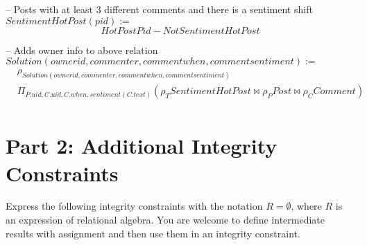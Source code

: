 \documentclass{article}
\newcommand{\var}[1]{\mathit{#1}}
\begin{document}
\begin{enumerate}
{-- Posts with at least 3 different comments and there is a sentiment shift \\
$\var{SentimentHotPost}(pid) :=$
\[
    \var{HotPostPid} - \var{NotSentimentHotPost}
\]


-- Adds owner info to above relation \\
$\var{Solution}(ownerid, commenter, commentwhen, commentsentiment) :=$
\begin{align*}
    &\rho_{\var{Solution}(ownerid, commenter, commentwhen, commentsentiment)}\\ 
    &\Pi_{P.uid, C.uid, C.when, sentiment(C.text)}
    (\rho_{T} \var{SentimentHotPost} \bowtie \rho_{P} \var{Post} \bowtie \rho_{C} \var{Comment})\\
\end{align*}



}

\end{enumerate}



\section*{Part 2: Additional Integrity Constraints}


Express the following integrity constraints
with the notation $R = \emptyset$, where $R$ is an expression of relational algebra. 
You are welcome to define intermediate results with assignment
and then use them in an integrity constraint.
\end{document}
